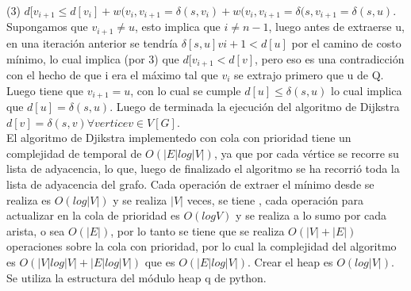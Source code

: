 \documentclass[12pt]{article}
\begin{document}
(3) $d[v_{i+1} \leq d[v_i] + w(v_i,v_{i+1} = \delta (s,v_i) + w(v_i, v_{i+1} = \delta (s,v_{i+1} = \delta (s,u)$.\\

Supongamos que $v_{i+1} \neq u$, esto implica que $i \neq n-1$, luego antes de extraerse u, en una iteraci\'on anterior se tendr\'ia $\delta [s,u]v{i+1} < d[u]$
por el camino de costo m\'inimo, lo cual implica (por 3) que $d[v_{i+1} < d[v]$, pero eso es una contradicci\'on con el hecho de que i era el m\'aximo tal 
que $v_i$ se extrajo primero que u de Q. Luego tiene que $v_{i+1} = u$, con lo cual se cumple $d[u] \leq \delta (s,u)$ lo cual implica que
$d[u] = \delta (s,u)$. Luego de terminada la ejecuci\'on del algoritmo de Dijkstra $d[v] = \delta (s,v) \forall vertice v \in V[G]$.\\


El algoritmo de Djikstra implementedo con cola con prioridad tiene un complejidad de temporal de $O(|E|log|V|)$, ya que por cada v\'ertice se recorre su lista de adyacencia, lo que, luego de finalizado el algoritmo se ha recorri\'o toda la lista de adyacencia del grafo. Cada operaci\'on de extraer el m\'inimo desde se realiza es $O(log|V|)$ y se realiza $|V|$ veces, se tiene
, cada operaci\'on para actualizar en la cola de prioridad es $O(logV)$ y se realiza a lo sumo por cada arista, o sea $O(|E|)$,
por lo tanto se tiene que se realiza $O(|V|+|E|)$ operaciones sobre la cola con prioridad, por lo cual la complejidad del algoritmo es $O(|V|log|V|+|E|log|V|)$ que es $O(|E|log|V|)$. Crear el heap es $O(log|V|)$. Se utiliza la estructura del m\'odulo heap q de python.\\
\end{document}
